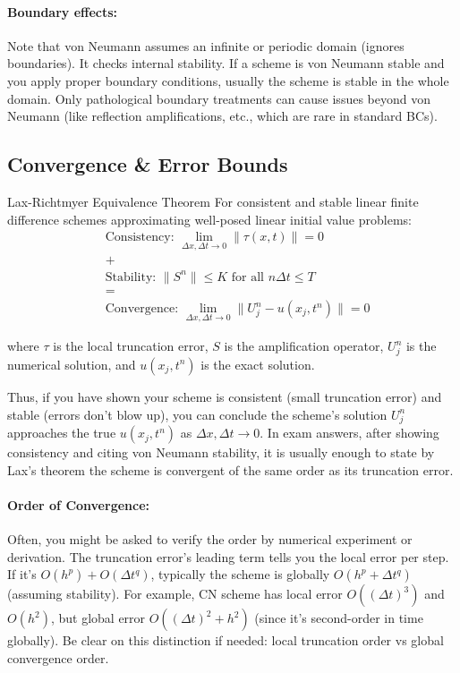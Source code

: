 \documentclass[a4paper,11pt]{report}
\begin{document}
\paragraph{Boundary effects:} Note that von Neumann assumes an infinite or periodic domain (ignores boundaries). It checks internal stability. If a scheme is von Neumann stable and you apply proper boundary conditions, usually the scheme is stable in the whole domain. Only pathological boundary treatments can cause issues beyond von Neumann (like reflection amplifications, etc., which are rare in standard BCs).

\subsection{Convergence \& Error Bounds}

\begin{theorem}{Lax-Richtmyer Equivalence Theorem}{}
    For consistent and stable linear finite difference schemes approximating well-posed linear initial value problems:
    \begin{align*}
         & \text{Consistency: } \lim_{\Delta x, \Delta t \to 0} \|\tau(x,t)\| = 0          \\
         & +                                                                               \\
         & \text{Stability: } \|S^n\| \leq K \text{ for all } n\Delta t \leq T             \\
         & =                                                                               \\
         & \text{Convergence: } \lim_{\Delta x, \Delta t \to 0} \|U_j^n - u(x_j,t^n)\| = 0
    \end{align*}

    \noindent where $\tau$ is the local truncation error, $S$ is the amplification operator, $U_j^n$ is the numerical solution, and $u(x_j,t^n)$ is the exact solution.
\end{theorem}
Thus, if you have shown your scheme is consistent (small truncation error) and stable (errors don't blow up), you can conclude the scheme's solution $U_j^n$ approaches the true $u(x_j,t^n)$ as $\Delta x, \Delta t \to 0$. In exam answers, after showing consistency and citing von Neumann stability, it is usually enough to state by Lax's theorem the scheme is convergent of the same order as its truncation error.

\paragraph{Order of Convergence:}
Often, you might be asked to verify the order by numerical experiment or derivation. The truncation error's leading term tells you the local error per step. If it's $O(h^p) + O(\Delta t^q)$, typically the scheme is globally $O(h^p + \Delta t^q)$ (assuming stability). For example, CN scheme has local error $O((\Delta t)^3)$ and $O(h^2)$, but global error $O((\Delta t)^2 + h^2)$ (since it's second-order in time globally). Be clear on this distinction if needed: local truncation order vs global convergence order.
\end{document}
